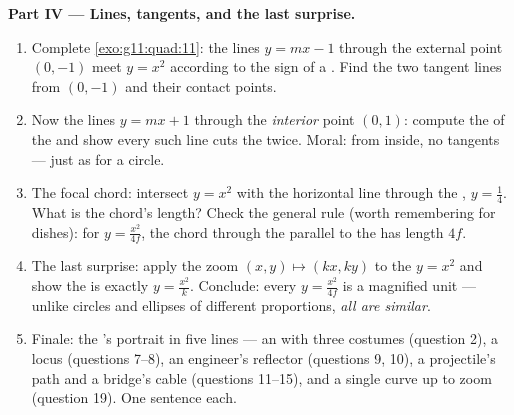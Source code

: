 \begin{problem}
\medskip
\noindent\textbf{Part IV --- Lines, tangents, and the last
surprise.}
\begin{enumerate}[resume]
  \item Complete \cref{exo:g11:quad:11}: the lines
        $y = mx - 1$ through the external point $(0, -1)$ meet
        $y = x^2$ according to the sign of a .
        Find the two tangent lines from $(0, -1)$ and their
        contact points.
  \item Now the lines $y = mx + 1$ through the \emph{interior}
        point $(0, 1)$: compute the  of the
          and show every such line cuts the
         twice. Moral: from inside, no tangents ---
        just as for a circle.
  \item The focal chord: intersect $y = x^2$ with the
        horizontal line through the , $y = \frac14$. What
        is the chord's length? Check the general rule (worth
        remembering for dishes): for $y = \frac{x^2}{4f}$, the
        chord through the  parallel to the  has
        length $4f$.
  \item The last surprise: apply the zoom
        $(x, y) \mapsto (kx, ky)$ to the  $y = x^2$ and
        show the  is exactly $y = \frac{x^2}{k}$. Conclude:
        every  $y = \frac{x^2}{4f}$ is a magnified unit
         --- unlike circles and ellipses of different
        proportions, \emph{all  are similar}.
  \item Finale: the 's portrait in five lines --- an
         with three costumes (question 2), a locus
        (questions 7--8), an engineer's reflector (questions 9,
        10), a projectile's path and a bridge's cable
        (questions 11--15), and a single curve up to zoom
        (question 19). One sentence each.
\end{enumerate}
\end{problem}

